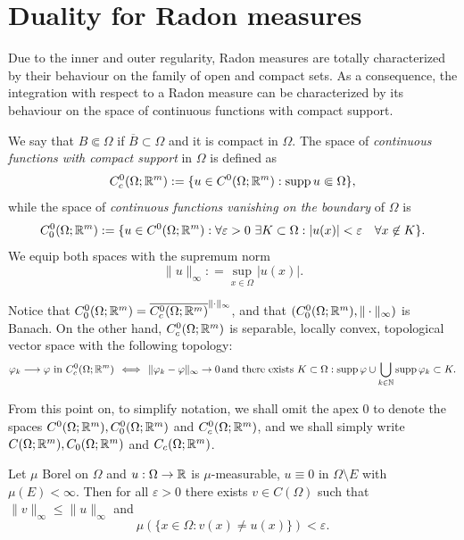 \section{Duality for Radon measures}

Due to the inner and outer regularity, Radon measures are totally characterized by their behaviour on the family of open and compact sets. As a consequence, the integration with respect to a Radon measure can be characterized by its behaviour on the space of continuous functions with compact support. 

\begin{definition}
We say that $B \Subset \Omega$ if $\overline{B} \subset \Omega$ and it is
compact in $\Omega$. The space of {\em continuous functions with compact support} in $\Omega$ is defined as
\[
C^0_{c}(\Omega; \mathbb{R}^m) := \{u \in C^0(\Omega;\mathbb{R}^m) : \operatorname{supp} u \Subset \Omega \},
\]
while the space of {\em continuous functions vanishing on the boundary} of $\Omega$ is
\[
C^0_0(\Omega; \mathbb{R}^m) := \{u \in C^0(\Omega;\mathbb{R}^m) : \forall \varepsilon > 0 \
\exists K \subset \Omega: |u(x)| < \varepsilon \quad \forall x \not\in K 
\}.
\]
We equip both spaces with the supremum norm
\[
\|u\|_{\infty} : = \sup_{x \in \Omega} |u(x)|.
\]
\end{definition}

\begin{remark}
Notice that $C^0_0(\Omega;\mathbb{R}^m) = \overline{C^0_c(\Omega;\mathbb{R}^m)}^{\|\cdot\|_\infty}$, and that $(C^0_0(\Omega;\mathbb{R}^m),\|\cdot\|_\infty)$ is Banach. On the other hand, $C^0_c(\Omega; \mathbb{R}^{m})$ is separable, locally convex, topological vector space with the following topology:
\[
\varphi_k \longrightarrow \varphi \text{ in } C^0_c(\Omega; \mathbb{R}^{m}) 
\, \iff \,
\|\varphi_k - \varphi\|_\infty \to 0
\, \text{and there exists } K \subset \Omega:
\operatorname{supp} \varphi \cup \bigcup_{k\in\mathbb{N}} \operatorname{supp} \varphi_k \subset K.
\]
\end{remark}

From this point on, to simplify notation, we shall omit the apex $0$ to denote the spaces $C^{0}(\Omega; \mathbb{R}^{m}), C_{0}^{0}(\Omega; \mathbb{R}^{m})$ and $C_{c}^{0}(\Omega; \mathbb{R}^{m})$, and we shall simply write $C(\Omega; \mathbb{R}^{m}), C_{0}(\Omega; \mathbb{R}^{m})$ and $C_{c}(\Omega; \mathbb{R}^{m})$.

\begin{theorem}[Lusin]
Let $\mu$ Borel on $\Omega$ and $u : \Omega \to \mathbb{R}$ is $\mu$-measurable, $u
\equiv 0$ in $\Omega \setminus E$ with $\mu(E) < \infty$. Then for all
$\varepsilon > 0$ there exists $v \in C(\Omega)$ such that $\|v\|_\infty
\leq \|u\|_\infty$ and
\[
\mu(\{x \in \Omega: v(x) \neq u(x)\}) < \varepsilon.
\]
\end{theorem}

